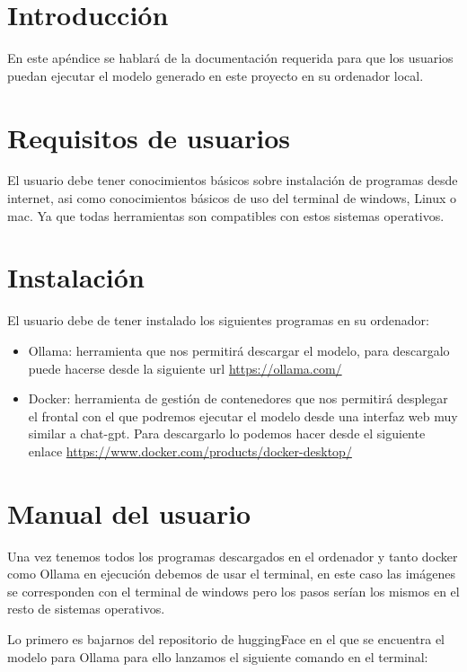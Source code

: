 \label{ap:manual}
\section{Introducción}

En este apéndice se hablará de la documentación requerida para que los usuarios puedan ejecutar el modelo generado en este proyecto en su ordenador local.

\section{Requisitos de usuarios}
El usuario debe tener conocimientos básicos sobre instalación de programas desde internet, asi como conocimientos básicos de uso del terminal de windows, Linux o mac. Ya que todas herramientas son compatibles con estos sistemas operativos.

\section{Instalación}
El usuario debe de tener instalado los siguientes programas en su ordenador:

\begin{itemize}
    \item Ollama: herramienta que nos permitirá descargar el modelo, para descargalo puede hacerse desde la siguiente url \url{https://ollama.com/}
    \item Docker: herramienta de gestión de contenedores que nos permitirá desplegar el frontal con el que podremos ejecutar el modelo desde una interfaz web muy similar a chat-gpt. Para descargarlo lo podemos hacer desde el siguiente enlace \url{https://www.docker.com/products/docker-desktop/}
\end{itemize}

\section{Manual del usuario}

Una vez tenemos todos los programas descargados en el ordenador y tanto docker como Ollama en ejecución debemos de usar el terminal, en este caso las imágenes se corresponden con el terminal de windows pero los pasos serían los mismos en el resto de sistemas operativos.

Lo primero es bajarnos del repositorio de huggingFace en el que se encuentra el modelo para Ollama para ello lanzamos el siguiente comando en el terminal:


